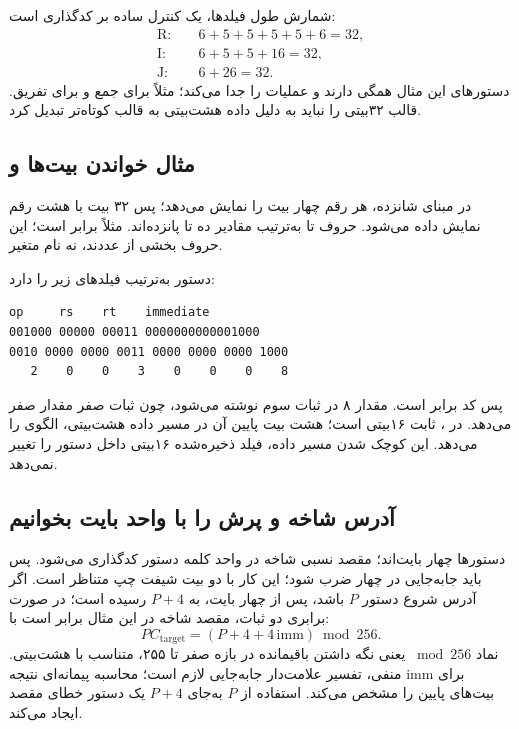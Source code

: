 شمارش طول فیلدها، یک کنترل ساده بر کدگذاری است:
\begin{align*}
\mathrm{R}:&\quad 6+5+5+5+5+6=32,\\
\mathrm{I}:&\quad 6+5+5+16=32,\\
\mathrm{J}:&\quad 6+26=32.
\end{align*}
دستورهای  این مثال همگی  دارند و 
عملیات را جدا می‌کند؛ مثلاً  برای جمع و  برای تفریق.
قالب ۳۲بیتی را نباید به دلیل داده هشت‌بیتی به قالب کوتاه‌تر تبدیل کرد.

\subsection{مثال خواندن بیت‌ها و }
در مبنای شانزده، هر رقم چهار بیت را نمایش می‌دهد؛ پس ۳۲ بیت با هشت رقم
نمایش داده می‌شود. حروف  تا  به‌ترتیب مقادیر ده تا پانزده‌اند.
مثلاً  برابر  است؛ این حروف بخشی از عددند، نه نام متغیر.

دستور  به‌ترتیب فیلدهای زیر را دارد:
\begin{latin}
\begin{verbatim}
op     rs    rt    immediate
001000 00000 00011 0000000000001000
0010 0000 0000 0011 0000 0000 0000 1000
   2    0    0    3    0    0    0    8
\end{verbatim}
\end{latin}
پس کد  برابر  است. مقدار ۸ در ثبات سوم نوشته می‌شود،
چون ثبات صفر مقدار صفر می‌دهد. در ، ثابت ۱۶بیتی
 است؛ هشت بیت پایین آن در مسیر داده هشت‌بیتی، الگوی  را می‌دهد.
این کوچک شدن مسیر داده، فیلد ذخیره‌شده ۱۶بیتی داخل دستور را تغییر نمی‌دهد.

\subsection{آدرس شاخه و پرش را با واحد بایت بخوانیم}
دستورها چهار بایت‌اند؛ مقصد نسبی شاخه در واحد کلمه دستور کدگذاری می‌شود.
پس باید جابه‌جایی در چهار ضرب شود؛ این کار با دو بیت شیفت چپ متناظر است.
اگر آدرس شروع دستور \(P\) باشد، پس از  چهار بایت،  به
\(P+4\) رسیده است؛ در صورت برابری دو ثبات، مقصد شاخه در این مثال برابر است با:
\begin{equation}\label{eq:mips-branch}
PC_{\mathrm{target}}=(P+4+4\,\mathrm{imm})\bmod256.
\end{equation}
نماد \(\bmod256\) یعنی نگه داشتن باقیمانده در بازه صفر تا ۲۵۵،
متناسب با  هشت‌بیتی. برای \(\mathrm{imm}\) منفی،
تفسیر علامت‌دار جابه‌جایی لازم است؛ محاسبه پیمانه‌ای نتیجه بیت‌های پایین را مشخص می‌کند.
استفاده از \(P\) به‌جای \(P+4\) یک دستور خطای مقصد ایجاد می‌کند.

